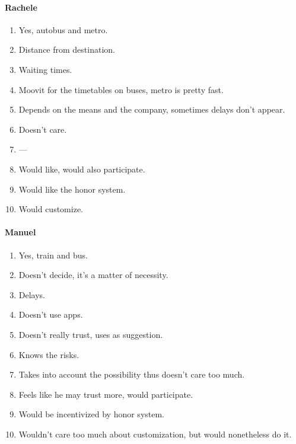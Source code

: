 \documentclass[a4paper, 10pt]{article}
\begin{document}
\paragraph*{Rachele}
\begin{enumerate}
    \item Yes, autobus and metro.
    \item Distance from destination.
    \item Waiting times.
    \item Moovit for the timetables on buses, metro is pretty fast.
    \item Depends on the means and the company, sometimes delays don't appear.
    \item Doesn't care.
    \item ---
    \item Would like, would also participate.
    \item Would like the honor system.
    \item Would customize.
\end{enumerate}

\paragraph*{Manuel}
\begin{enumerate}
    \item Yes, train and bus.
    \item Doesn't decide, it's a matter of necessity.
    \item Delays.
    \item Doesn't use apps.
    \item Doesn't really trust, uses as suggestion.
    \item Knows the risks.
    \item Takes into account the possibility thus doesn't care too much.
    \item Feels like he may trust more, would participate.
    \item Would be incentivized by honor system.
    \item Wouldn't care too much about customization, but would nonetheless do it.
\end{enumerate}
\end{document}
